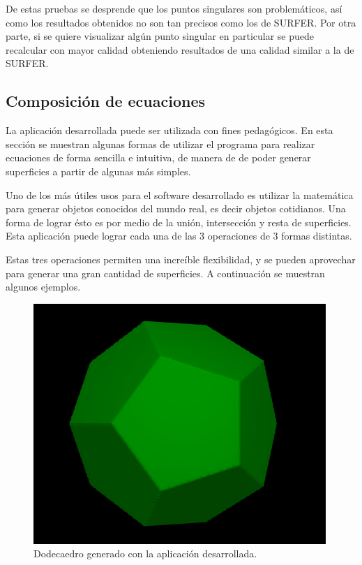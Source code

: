 \documentclass[12pt]{article}
\begin{document}
De estas pruebas se desprende que los puntos singulares son problemáticos, así como los resultados obtenidos no son tan precisos como los de SURFER. Por otra parte, si se quiere visualizar algún punto singular en particular se puede recalcular con mayor calidad obteniendo resultados de una calidad similar a la de SURFER.

\subsection{Composición de ecuaciones}
La aplicación desarrollada puede ser utilizada con fines pedagógicos. En esta sección se muestran algunas formas de utilizar el programa para  realizar ecuaciones de forma sencilla e intuitiva, de manera de de poder generar superficies a partir de algunas más simples.

Uno de los más útiles usos para el software desarrollado es utilizar la matemática para generar objetos conocidos del mundo real, es decir objetos cotidianos. Una forma de lograr ésto es por medio de la unión, intersección y resta de superficies. Esta aplicación puede lograr cada una de las 3 operaciones de 3 formas distintas.

Estas tres operaciones permiten una increíble flexibilidad, y se pueden aprovechar para generar una gran cantidad de superficies. A continuación se muestran algunos ejemplos.\\
\begin{figure}
\includegraphics[width=0.9\linewidth]{dodecaedro.png} 
\caption{Dodecaedro generado con la aplicación desarrollada.}
\label{dode}
\end{figure}
\end{document}
